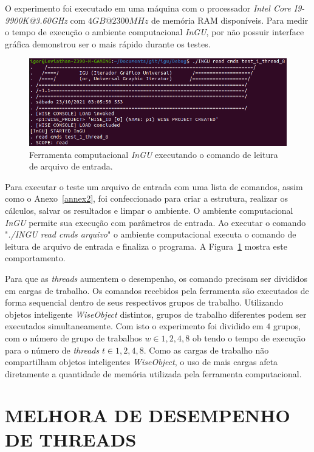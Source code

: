 O experimento foi executado em uma máquina com o processador \textit{Intel Core I9-9900K@3.60GHz} com $4GB@2300MHz$ de memória RAM disponíveis. Para medir o tempo de execução o ambiente computacional \textit{InGU}, por não possuir interface gráfica demonstrou ser o mais rápido durante os testes.


\begin{figure}[!htbp]
	\centering
	\includegraphics[width=\linewidth]{Figures/INGU.png}
	\caption{Ferramenta computacional \textit{InGU} executando o comando de leitura de arquivo de entrada.}
	\label{fig:INGU}
\end{figure}

Para executar o teste um arquivo de entrada com uma lista de comandos, assim como o Anexo~\ref{annex2}, foi confeccionado para criar a estrutura, realizar os cálculos, salvar os resultados e limpar o ambiente. O ambiente computacional \textit{InGU} permite sua execução com parâmetros de entrada. Ao executar o comando "\textit{./INGU read cmds arquivo}" o ambiente computacional executa o comando de leitura de arquivo de entrada e finaliza o programa. A Figura~\ref{fig:INGU} mostra este comportamento.

Para que as \textit{threads} aumentem o desempenho, os comando precisam ser divididos em cargas de trabalho. Os comandos recebidos pela ferramenta são executados de forma sequencial dentro de seus respectivos grupos de trabalho. Utilizando objetos inteligente \textit{WiseObject} distintos, grupos de trabalho diferentes podem ser executados simultaneamente. Com isto o experimento foi dividido em $4$ grupos, com o número de grupo de trabalhos $w \in {1,2,4,8}$ ob tendo o tempo de execução para o número de \textit{threads} $t \in {1,2,4,8}$. Como as cargas de trabalho não compartilham objetos inteligentes \textit{WiseObject}, o uso de mais cargas afeta diretamente a quantidade de memória utilizada pela ferramenta computacional.


\section{MELHORA DE DESEMPENHO DE THREADS}\label{sec:cenario4}

